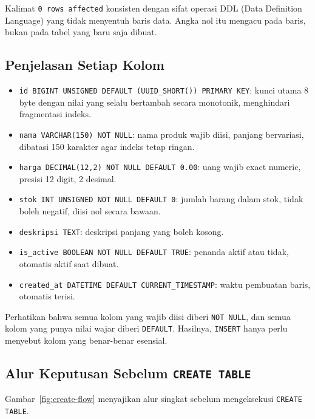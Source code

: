\documentclass[11pt,a4paper]{article}
\begin{document}
Kalimat \texttt{0 rows affected} konsisten dengan sifat operasi DDL (Data Definition Language) yang tidak menyentuh baris data. Angka nol itu mengacu pada baris, bukan pada tabel yang baru saja dibuat.

\subsection{Penjelasan Setiap Kolom}

\begin{itemize}
	\item \texttt{id BIGINT UNSIGNED DEFAULT (UUID\_SHORT()) PRIMARY KEY}: kunci utama 8 byte dengan nilai yang selalu bertambah secara monotonik, menghindari fragmentasi indeks.
	\item \texttt{nama VARCHAR(150) NOT NULL}: nama produk wajib diisi, panjang bervariasi, dibatasi 150 karakter agar indeks tetap ringan.
	\item \texttt{harga DECIMAL(12,2) NOT NULL DEFAULT 0.00}: uang wajib exact numeric, presisi 12 digit, 2 desimal.
	\item \texttt{stok INT UNSIGNED NOT NULL DEFAULT 0}: jumlah barang dalam stok, tidak boleh negatif, diisi nol secara bawaan.
	\item \texttt{deskripsi TEXT}: deskripsi panjang yang boleh kosong.
	\item \texttt{is\_active BOOLEAN NOT NULL DEFAULT TRUE}: penanda aktif atau tidak, otomatis aktif saat dibuat.
	\item \texttt{created\_at DATETIME DEFAULT CURRENT\_TIMESTAMP}: waktu pembuatan baris, otomatis terisi.
\end{itemize}

Perhatikan bahwa semua kolom yang wajib diisi diberi \texttt{NOT NULL}, dan semua kolom yang punya nilai wajar diberi \texttt{DEFAULT}. Hasilnya, \texttt{INSERT} hanya perlu menyebut kolom yang benar-benar esensial.

\subsection{Alur Keputusan Sebelum \texttt{CREATE TABLE}}

Gambar~\ref{fig:create-flow} menyajikan alur singkat sebelum mengeksekusi \texttt{CREATE TABLE}.
\end{document}
